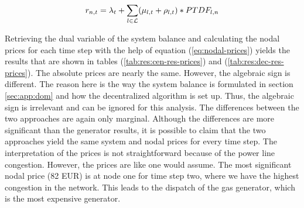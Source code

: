 \begin{equation}
	r_{n,t} = \lambda_t + \sum_{l \in \mathcal{L}} (\mu_{l,t} + \rho_{l,t}) * PTDF_{l,n}
	\label{eq:nodal-prices}
\end{equation}

Retrieving the dual variable of the system balance and calculating the nodal prices for each time step with the help of equation (\ref{eq:nodal-prices}) yields the results that are shown in tables (\ref{tab:res:cen-res-prices}) and (\ref{tab:res:dec-res-prices}). The absolute prices are nearly the same. However, the algebraic sign is different. The reason here is the way the system balance is formulated in section \ref{sec:app:dom} and how the decentralized algorithm is set up. Thus, the algebraic sign is irrelevant and can be ignored for this analysis. The differences between the two approaches are again only marginal. Although the differences are more significant than the generator results, it is possible to claim that the two approaches yield the same system and nodal prices for every time step. The interpretation of the prices is not straightforward because of the power line congestion. However, the prices are like one would assume. The most significant nodal price (82 EUR) is at node one for time step two, where we have the highest congestion in the network. This leads to the dispatch of the gas generator, which is the most expensive generator.
